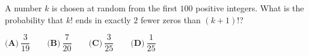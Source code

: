 A number $k$ is chosen at random from the first $100$ positive integers. What is the probability that $k!$ ends in exactly $2$ fewer zeros than $(k+1)!$?

$\textbf{(A)}\ \dfrac{3}{19}\qquad\textbf{(B)}\ \dfrac{7}{20}\qquad\textbf{(C)}\ \dfrac{3}{25}\qquad\textbf{(D)}\ \dfrac{1}{25}$
